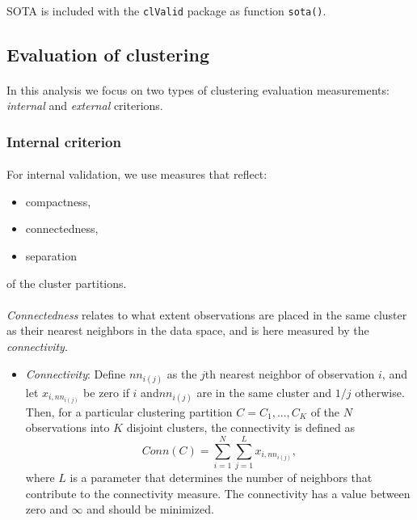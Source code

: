\documentclass[10pt]{article}\usepackage[]{graphicx}\usepackage[]{color}
\begin{document}
\paragraph{}
SOTA is included with the \texttt{clValid} package as function \texttt{sota()}.



\subsection{Evaluation of clustering}
\paragraph{}
In this analysis we focus on two types of clustering evaluation measurements: \textit{internal} and \textit{external} criterions.



\subsubsection{Internal criterion}
\paragraph{}
For internal validation, we use measures that reflect:
\begin{itemize}
\item compactness,
\item connectedness,
\item separation
\end{itemize}
of the cluster partitions.
\paragraph{}
\textit{Connectedness} relates to what extent observations
are placed in the same cluster as their nearest neighbors in the data space, and is here
measured by the \textit{connectivity}. 
\begin{itemize}
\item \textit{Connectivity}:
\newline \newline 
Define $nn_{i(j)}$ as the $j$th nearest neighbor of observation $i$, and let $x_{i,nn_{i(j)}}$ be zero 
if $i$ and$nn_{i(j)}$ are in the same cluster and $1/j$ otherwise. Then, for a particular clustering partition
$C = {C_1,..., C_K}$ of the $N$ observations into $K$ disjoint clusters, the connectivity is defined
as
$$Conn(C)=\sum_{i=1}^{N}\sum_{j=1}^{L}x_{i, nn_{i(j)}},$$
where $L$ is a parameter that determines the number of neighbors that contribute to the
connectivity measure. The connectivity has a value between zero and $\infty$ and should be
minimized.
\end{itemize}
\end{document}

